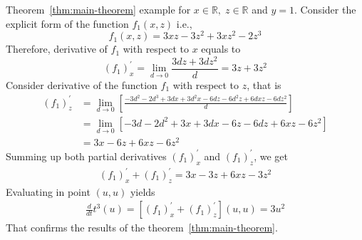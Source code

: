 \begin{example}
    \normalfont
    Theorem~\ref{thm:main-theorem} example for $x\in\mathbb{R}, \; z\in \mathbb{R}$ and $y=1$.
    Consider the explicit form of the function $f_{1} (x, z)$ i.e.,
    \[
        f_1(x, z) = 3 x z - 3 z^2 + 3 x z^2 - 2 z^3
    \]
    Therefore, derivative of $f_{1}$ with respect to $x$ equals to
    \[
        (f_1)^{'}_{x} = \lim_{d \to 0} \frac{3 d z + 3 d z^2}{d} = 3 z + 3 z^2
    \]
    Consider derivative of the function $f_1$ with respect to $z$, that is
    \begin{align*}
    (f_1)
        ^{'}_{z}
        &= \lim_{d \to 0} \left[\frac{-3 d^2 - 2 d^3 + 3 d x + 3 d^2 x - 6 d z - 6 d^2 z + 6 d x z - 6 d z^2}{d} \right] \\
        &= \lim_{d \to 0} \left[ -3 d - 2 d^2 + 3 x + 3 d x - 6 z - 6 d z + 6 x z - 6 z^2 \right] \\
        &=3 x - 6 z + 6 x z - 6 z^2
    \end{align*}
    Summing up both partial derivatives $(f_1)^{'}_{x}$ and $(f_1)^{'}_{z}$, we get
    \begin{align*}
    (f_1)
        ^{'}_{x} + (f_1)^{'}_{z} = 3 x - 3 z + 6 x z - 3 z^2
    \end{align*}
    Evaluating in point $(u, u)$ yields
    \begin{align*}
        \frac{d}{dt} t^{3} (u) = [(f_1)^{'}_{x} + (f_1)^{'}_{z}] (u,u)  = 3 u^2
    \end{align*}
    That confirms the results of the theorem~\ref{thm:main-theorem}.
\end{example}
